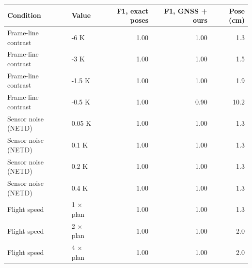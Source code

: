 \begin{tabular}{llrrr}
\toprule
Condition & Value & F1, exact poses & F1, GNSS + ours & Pose (cm) \\
\midrule
Frame-line contrast & -6 K & 1.00 & 1.00 & 1.3 \\
Frame-line contrast & -3 K & 1.00 & 1.00 & 1.5 \\
Frame-line contrast & -1.5 K & 1.00 & 1.00 & 1.9 \\
Frame-line contrast & -0.5 K & 1.00 & 0.90 & 10.2 \\
Sensor noise (NETD) & 0.05 K & 1.00 & 1.00 & 1.3 \\
Sensor noise (NETD) & 0.1 K & 1.00 & 1.00 & 1.3 \\
Sensor noise (NETD) & 0.2 K & 1.00 & 1.00 & 1.3 \\
Sensor noise (NETD) & 0.4 K & 1.00 & 1.00 & 1.3 \\
Flight speed & 1 $\times$ plan & 1.00 & 1.00 & 1.3 \\
Flight speed & 2 $\times$ plan & 1.00 & 1.00 & 2.0 \\
Flight speed & 4 $\times$ plan & 1.00 & 1.00 & 2.0 \\
\bottomrule
\end{tabular}

